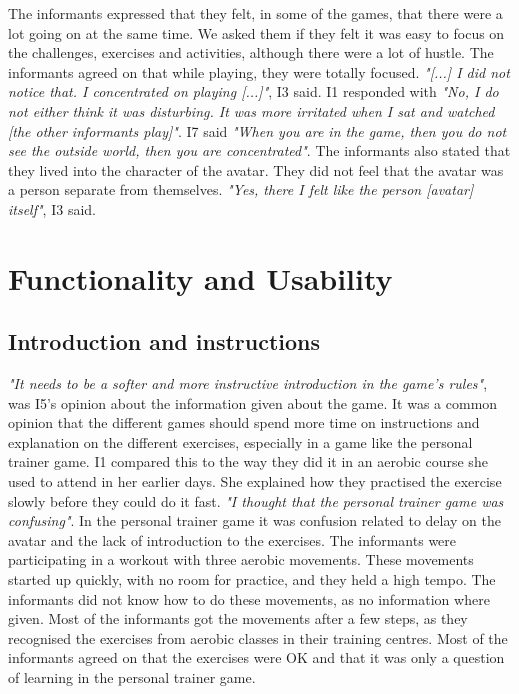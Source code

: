 The informants expressed that they felt, in some of the games, that there were a lot going on at the same time. We asked them if they felt it was easy to focus on the challenges, exercises and activities, although there were a lot of hustle. The informants agreed on that while playing, they were totally focused. \emph{"[...] I did not notice that. I concentrated on playing [...]"}, I3 said. I1 responded with \emph{"No, I do not either think it was disturbing. It was more irritated when I sat and watched [the other informants play]"}. I7 said \emph{"When you are in the game, then you do not see the outside world, then you are concentrated"}. The informants also stated that they lived into the character of the avatar. They did not feel that the avatar was a person separate from themselves. \emph{"Yes, there I felt like the person [avatar] itself"}, I3 said. 

\section{Functionality and Usability}
\subsection{Introduction and instructions}
\emph{"It needs to be a softer and more instructive introduction in the game's rules"}, was I5's opinion about the information given about the game. It was a common opinion that the different games should spend more time on instructions and explanation on the different exercises, especially in a game like the personal trainer game. I1 compared this to the way they did it in an aerobic course she used to attend in her earlier days. She explained how they practised the exercise slowly before they could do it fast. \emph{"I thought that the personal trainer game was confusing"}. In the personal trainer game it was confusion related to delay on the avatar and the lack of introduction to the exercises. The informants were participating in a workout with three aerobic movements. These movements started up quickly, with no room for practice, and they held a high tempo. The informants did not know how to do these movements, as no information where given. Most of the informants got the movements after a few steps, as they recognised the exercises from aerobic classes in their training centres. Most of the informants agreed on that the exercises were OK and that it was only a question of learning in the personal trainer game. 


